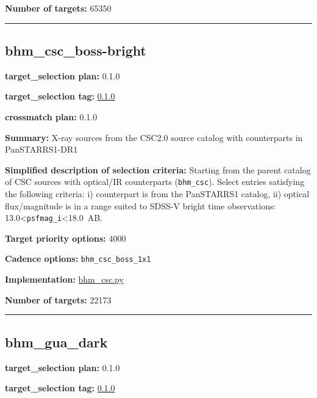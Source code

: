 \noindent\textbf{Number of targets:} 65350

\begin{center}\rule{0.5\linewidth}{0.5pt}\end{center}

\hypertarget{bhm_csc_boss-bright_plan0.1.0}{%
\subsection{bhm\_csc\_boss-bright}\label{bhm_csc_boss-bright_plan0.1.0}}

\noindent\textbf{target\_selection plan:} 0.1.0

\noindent\textbf{target\_selection tag:}
\href{https://github.com/sdss/target_selection/tree/0.1.0/}{0.1.0}

\noindent\textbf{crossmatch plan:} 0.1.0

\noindent\textbf{Summary:} X-ray sources from the CSC2.0 source catalog with
counterparts in PanSTARRS1-DR1

\noindent\textbf{Simplified description of selection criteria:} Starting from the
parent catalog of CSC sources with optical/IR counterparts
(\texttt{bhm\_csc}). Select entries satisfying the following criteria:
i) counterpart is from the PanSTARRS1 catalog, ii) optical
flux/magnitude is in a range suited to SDSS-V bright time observations:
13.0\textless{}\texttt{psfmag\_i}\textless18.0~AB.


\noindent\textbf{Target priority options:} 4000

\noindent\textbf{Cadence options:} \texttt{bhm\_csc\_boss\_1x1}

\noindent\textbf{Implementation:}
\href{https://github.com/sdss/target_selection/blob/0.1.0/python/target_selection/cartons/bhm_csc.py}{bhm\_csc.py}

\noindent\textbf{Number of targets:} 22173

\begin{center}\rule{0.5\linewidth}{0.5pt}\end{center}

\hypertarget{bhm_gua_dark_plan0.1.0}{%
\subsection{bhm\_gua\_dark}\label{bhm_gua_dark_plan0.1.0}}

\noindent\textbf{target\_selection plan:} 0.1.0

\noindent\textbf{target\_selection tag:}
\href{https://github.com/sdss/target_selection/tree/0.1.0/}{0.1.0}

